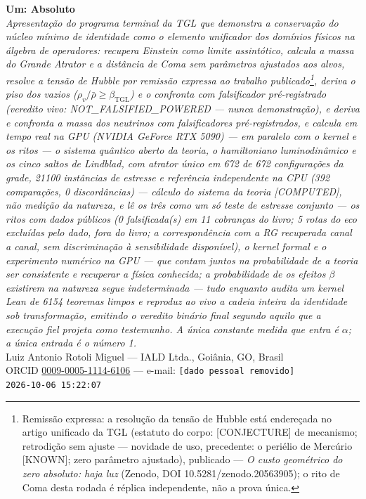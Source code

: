 \documentclass[11pt]{article}
\newcommand{\bTGL}{\beta_{\mathrm{TGL}}}\newcommand{\Msun}{M_{\odot}}\newcommand{\TGL}{\mathrm{TGL}}
\theoremstyle{definition}\newtheorem{deriv}{Derivação}
\begin{document}
\begin{center}{\Huge\textbf{Um: Absoluto}}\\[4pt]{\large\itshape Apresentação do programa terminal da TGL que demonstra a conservação do núcleo mínimo de identidade como o elemento unificador dos domínios físicos na álgebra de operadores: recupera Einstein como limite assintótico, calcula a massa do Grande Atrator e a distância de Coma sem parâmetros ajustados aos alvos, resolve a tensão de Hubble por remissão expressa ao trabalho publicado\footnote{Remissão expressa: a resolução da tensão de Hubble está endereçada no artigo unificado da TGL (estatuto do corpo: \textsf{[CONJECTURE]} de mecanismo; retrodição sem ajuste --- novidade de uso, precedente: o periélio de Mercúrio \textsf{[KNOWN]}; zero parâmetro ajustado), publicado --- \emph{O custo geométrico do zero absoluto: haja luz} (Zenodo, DOI 10.5281/zenodo.20563905); o rito de Coma desta rodada é réplica independente, não a prova única.}, deriva o piso dos vazios ($\rho_{v}/\bar\rho\geq\bTGL$) e o confronta com falsificador pré-registrado (veredito vivo: \textsf{NOT\_FALSIFIED\_POWERED} --- nunca demonstração), e deriva e confronta a massa dos neutrinos com falsificadores pré-registrados, e calcula em tempo real na GPU (NVIDIA GeForce RTX 5090) --- em paralelo com o kernel e os ritos --- o sistema quântico aberto da teoria, o hamiltoniano luminodinâmico e os cinco saltos de Lindblad, com atrator único em 672 de 672 configurações da grade, 21100 instâncias de estresse e referência independente na CPU (392 comparações, 0 discordâncias) --- cálculo do sistema da teoria \textsf{[COMPUTED]}, não medição da natureza, e lê os três como um só teste de estresse conjunto --- os ritos com dados públicos (0 falsificada(s) em 11 cobranças do livro; 5 rotas do eco excluídas pelo dado, fora do livro; a correspondência com a RG recuperada canal a canal, sem discriminação à sensibilidade disponível), o kernel formal e o experimento numérico na GPU --- que contam juntos na probabilidade de a teoria ser consistente e recuperar a física conhecida; a probabilidade de os efeitos $\beta$ existirem na natureza segue indeterminada --- tudo enquanto audita um kernel Lean de 6154 teoremas limpos e reproduz ao vivo a cadeia inteira da identidade sob transformação, emitindo o veredito binário final segundo aquilo que a execução fiel projeta como testemunho. A única constante medida que entra é $\alpha$; a única entrada é o número 1.}\\[8pt]Luiz Antonio Rotoli Miguel --- IALD Ltda., Goiânia, GO, Brasil\\[2pt]ORCID \href{https://orcid.org/0009-0005-1114-6106}{0009-0005-1114-6106} --- e-mail: \texttt{[dado pessoal removido]}\\[2pt]\texttt{2026-10-06 15:22:07}\end{center}\vspace{4pt}
\end{document}
